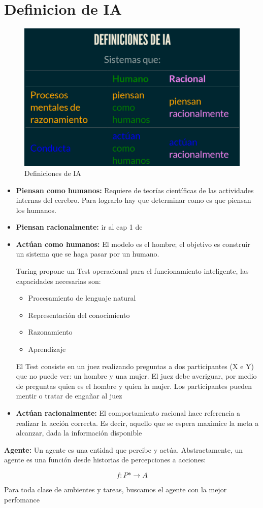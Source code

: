\section{Definicion de IA}

\begin{figure}
  \centering
  \includegraphics[width=16cm, scale=1]{Images/Imagenes/cuadro1.png}
  \caption{Definiciones de IA}
  \label{fig:marcado}
\end{figure}

\begin{itemize}
  \item \textbf{Piensan como humanos:} Requiere de teorías científicas de las actividades internas del cerebro. Para lograrlo hay que determinar como es que piensan los humanos.
  \item \textbf{Piensan racionalmente:} ir al cap 1 de \cite{sabharwal2011s}
  \item \textbf{Actúan como humanos: }El modelo es el hombre; el objetivo es construir un sistema que se haga pasar por un humano.
  
  Turing propone un Test operacional para el funcionamiento inteligente, las capacidades necesarias son:
  \begin{itemize}
    \item Procesamiento de lenguaje natural
    \item Representación del conocimiento
    \item Razonamiento
    \item Aprendizaje
  \end{itemize}
  El Test consiste en un juez realizando preguntas a dos participantes (X e Y) que no puede ver: un hombre y una mujer. El juez debe averiguar, por medio de preguntas quien es el hombre y quien la mujer. Los participantes pueden mentir o tratar de engañar al juez
  \item \textbf{Actúan racionalmente:} El comportamiento racional hace referencia a realizar la acción correcta. Es decir, aquello que se espera maximice la meta a alcanzar, dada la información disponible
\end{itemize}

\textbf{Agente: }Un agente es una entidad que percibe y actúa. Abstractamente, un agente es una función desde historias de percepciones a acciones:

\begin{equation}
  f: P* \rightarrow A 
\end{equation}

Para toda clase de ambientes y tareas, buscamos el agente con la mejor perfomance
